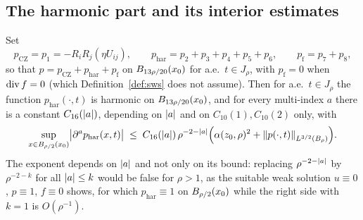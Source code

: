 \documentclass[11pt,reqno]{amsart}
\begin{document}
\subsection{The harmonic part and its interior estimates}\label{ss:harmonic}

\begin{corollary}
\label{cor:CZ-harmonic}
Set
\begin{equation}\label{eq:CZ-harmonic}
  p_{\mathrm{CZ}}=p_{1}=-R_{i}R_{j}(\eta U_{ij}),
  \qquad
  p_{\mathrm{har}}=p_{2}+p_{3}+p_{4}+p_{5}+p_{6},
  \qquad
  p_{\mathrm{f}}=p_{7}+p_{8},
\end{equation}
so that $p=p_{\mathrm{CZ}}+p_{\mathrm{har}}+p_{\mathrm{f}}$ on
$B_{13\rho/20}(x_{0})$ for a.e.\ $t\in J_{\rho}$, with
$p_{\mathrm{f}}=0$ when $\operatorname{div} f=0$ (which Definition~\ref{def:sws} does not
assume). Then for a.e.\ $t\in J_{\rho}$ the function
$p_{\mathrm{har}}(\cdot,t)$ is harmonic on $B_{13\rho/20}(x_{0})$, and for
every multi-index $a$ there is a constant $C_{16}(\left\lvert a \right\rvert)$, depending on
$\left\lvert a \right\rvert$ and on $C_{10}(1),C_{10}(2)$ only, with
\begin{equation}\label{eq:har-Ck}
  \sup_{x\in B_{\rho/2}(x_{0})}
    \bigl|\partial^{a}p_{\mathrm{har}}(x,t)\bigr|
  \;\le\;C_{16}(\left\lvert a \right\rvert)\,\rho^{-2-\left\lvert a \right\rvert}
      \Bigl(\alpha(z_{0},\rho)^{2}+\left\lVert p(\cdot,t) \right\rVert_{L^{3/2}(B_{\rho})}\Bigr).
\end{equation}
The exponent depends on $\left\lvert a \right\rvert$ and not only on its bound: replacing
$\rho^{-2-\left\lvert a \right\rvert}$ by $\rho^{-2-k}$ for all $\left\lvert a \right\rvert\le k$ would be false for
$\rho>1$, as the suitable weak solution $u\equiv0$, $p\equiv1$, $f\equiv0$
shows, for which $p_{\mathrm{har}}\equiv1$ on $B_{\rho/2}(x_{0})$ while the
right side with $k=1$ is $O(\rho^{-1})$.
\end{corollary}
\end{document}
